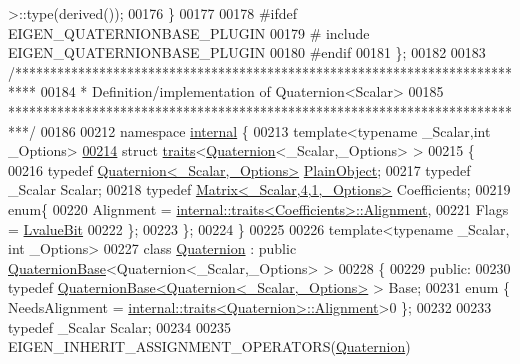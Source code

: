 \begin{DoxyCode}
       >::type(derived());
00176   \}
00177 
00178 \textcolor{preprocessor}{#ifdef EIGEN\_QUATERNIONBASE\_PLUGIN}
00179 \textcolor{preprocessor}{# include EIGEN\_QUATERNIONBASE\_PLUGIN}
00180 \textcolor{preprocessor}{#endif}
00181 \};
00182 
00183 \textcolor{comment}{/***************************************************************************}
00184 \textcolor{comment}{* Definition/implementation of Quaternion<Scalar>}
00185 \textcolor{comment}{***************************************************************************/}
00186 
00212 \textcolor{keyword}{namespace }\hyperlink{namespaceinternal}{internal} \{
00213 \textcolor{keyword}{template}<\textcolor{keyword}{typename} \_Scalar,\textcolor{keywordtype}{int} \_Options>
\hyperlink{struct_eigen_1_1internal_1_1traits_3_01_quaternion_3_01___scalar_00_01___options_01_4_01_4}{00214} \textcolor{keyword}{struct }\hyperlink{struct_eigen_1_1internal_1_1traits}{traits}<\hyperlink{group___geometry___module_class_eigen_1_1_quaternion}{Quaternion}<\_Scalar,\_Options> >
00215 \{
00216   \textcolor{keyword}{typedef} \hyperlink{group___geometry___module_class_eigen_1_1_quaternion}{Quaternion<\_Scalar,\_Options>} \hyperlink{group___geometry___module_class_eigen_1_1_quaternion}{PlainObject};
00217   \textcolor{keyword}{typedef} \_Scalar Scalar;
00218   \textcolor{keyword}{typedef} \hyperlink{group___core___module_class_eigen_1_1_matrix}{Matrix<\_Scalar,4,1,\_Options>} Coefficients;
00219   \textcolor{keyword}{enum}\{
00220     Alignment = \hyperlink{struct_eigen_1_1internal_1_1traits}{internal::traits<Coefficients>::Alignment},
00221     Flags = \hyperlink{group__flags_gae2c323957f20dfdc6cb8f44428eaec1a}{LvalueBit}
00222   \};
00223 \};
00224 \}
00225 
00226 \textcolor{keyword}{template}<\textcolor{keyword}{typename} \_Scalar, \textcolor{keywordtype}{int} \_Options>
00227 \textcolor{keyword}{class }\hyperlink{group___geometry___module_class_eigen_1_1_quaternion}{Quaternion} : \textcolor{keyword}{public} \hyperlink{group___geometry___module_class_eigen_1_1_quaternion_base}{QuaternionBase}<Quaternion<\_Scalar,\_Options> >
00228 \{
00229 \textcolor{keyword}{public}:
00230   \textcolor{keyword}{typedef} \hyperlink{group___geometry___module_class_eigen_1_1_quaternion_base}{QuaternionBase<Quaternion<\_Scalar,\_Options>} > Base;
00231   \textcolor{keyword}{enum} \{ NeedsAlignment = \hyperlink{struct_eigen_1_1internal_1_1traits}{internal::traits<Quaternion>::Alignment}>0 
      \};
00232 
00233   \textcolor{keyword}{typedef} \_Scalar Scalar;
00234 
00235   EIGEN\_INHERIT\_ASSIGNMENT\_OPERATORS(\hyperlink{group___geometry___module_class_eigen_1_1_quaternion}{Quaternion})

\end{DoxyCode}
